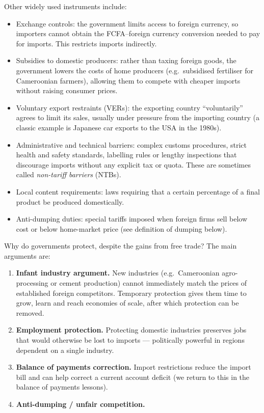 \documentclass[11pt]{article}
\newcommand{\cle}[1]{{\popxbold\color{popdark}#1}}
\newcounter{popsec}
\newcounter{popsub}
\newcommand{\courssub}[1]{%
  \stepcounter{popsub}%
  \par\vspace{9pt}\noindent{\popxbold\fontsize{11.5}{13}\selectfont\color{popink}{\color{poporange}\thepopsec.\thepopsub}\hspace{6pt}#1}\par\nopagebreak\vspace{4pt}
}
\begin{document}
Other widely used instruments include:
\begin{itemize}
\item \cle{Exchange controls}: the government limits access to foreign currency, so importers cannot obtain the FCFA--foreign currency conversion needed to pay for imports. This restricts imports indirectly.
\item \cle{Subsidies to domestic producers}: rather than taxing foreign goods, the government lowers the costs of home producers (e.g.\ subsidised fertiliser for Cameroonian farmers), allowing them to compete with cheaper imports without raising consumer prices.
\item \cle{Voluntary export restraints (VERs)}: the exporting country ``voluntarily'' agrees to limit its sales, usually under pressure from the importing country (a classic example is Japanese car exports to the USA in the 1980s).
\item \cle{Administrative and technical barriers}: complex customs procedures, strict health and safety standards, labelling rules or lengthy inspections that discourage imports without any explicit tax or quota. These are sometimes called \emph{non-tariff barriers} (NTBs).
\item \cle{Local content requirements}: laws requiring that a certain percentage of a final product be produced domestically.
\item \cle{Anti-dumping duties}: special tariffs imposed when foreign firms sell below cost or below home-market price (see definition of dumping below).
\end{itemize}

\courssub{Arguments For Protection}

Why do governments protect, despite the gains from free trade? The main arguments are:

\begin{enumerate}
\item \textbf{Infant industry argument.} New industries (e.g.\ Cameroonian agro-processing or cement production) cannot immediately match the prices of established foreign competitors. Temporary protection gives them time to grow, learn and reach economies of scale, after which protection can be removed.
\item \textbf{Employment protection.} Protecting domestic industries preserves jobs that would otherwise be lost to imports --- politically powerful in regions dependent on a single industry.
\item \textbf{Balance of payments correction.} Import restrictions reduce the import bill and can help correct a current account deficit (we return to this in the balance of payments lessons).
\item \textbf{Anti-dumping / unfair competition.}
\end{enumerate}
\end{document}
